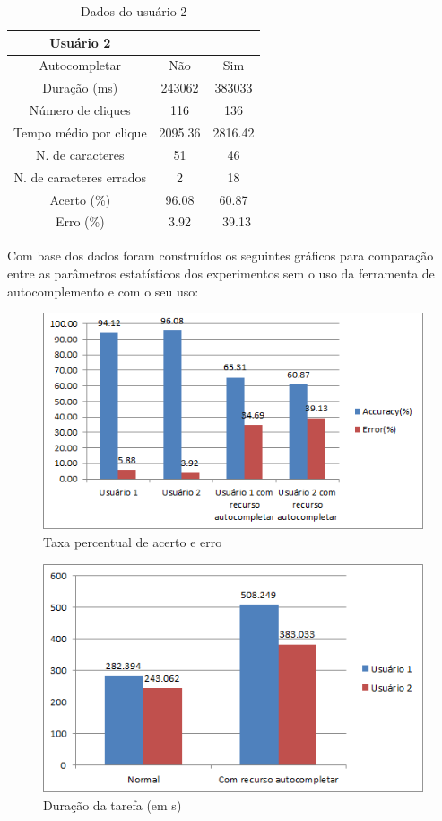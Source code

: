 \documentclass[twoside]{article}
\begin{document}
\begin{multicols}{2}
\begin{table}[H]
\caption{Dados do usuário 2}
\centering
\begin{tabular}{ccc}
\toprule
 Usuário 2 &  & \\
\midrule
Autocompletar & Não & Sim\\
Duração (ms) & 243062 & 383033\\
Número de cliques & 116 & 136\\
Tempo médio por clique & 2095.36 & 2816.42\\
N. de caracteres & 51 & 46\\
N. de caracteres errados & 2 & 18\\
Acerto (\%) & 96.08 & 60.87\\
Erro (\%) & 3.92 &\ 39.13\\
\bottomrule
\end{tabular}
\end{table}

Com base dos dados foram construídos os seguintes gráficos para comparação entre as parâmetros estatísticos dos experimentos sem o uso da ferramenta de autocomplemento e com o seu uso:

\begin{figure}[H]
\label{fig:graph_tx}
  \caption{Taxa percentual de acerto e erro}
  \centering
    \includegraphics[scale = 0.50]{graph_acertoerro.png}
\end{figure}

\begin{figure}[H]
\label{fig:graph_d}
  \caption{Duração da tarefa (em s)}
  \centering
    \includegraphics[scale = 0.50]{graph_duracao.png}
\end{figure}


\end{multicols}
\end{document}
